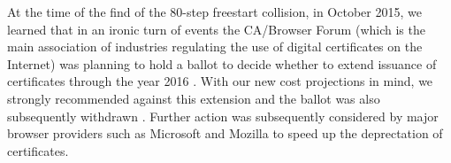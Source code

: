 \medskip

At the time of the find of the 80-step freestart collision, in October 2015, we learned that in an ironic turn of events the CA/Browser Forum (which is the main association of industries regulating the use of digital certificates on the Internet)
was planning to hold a ballot to decide whether to extend issuance of \shaone certificates through the year 2016 \cite{cabforum}.
With our new cost projections in mind, we strongly recommended against this extension and the ballot was also subsequently withdrawn \cite{cabforum2}.
Further action was subsequently considered by major browser providers such as Microsoft \cite{MS_sha} and Mozilla \cite{Moz_sha} to speed up the deprectation of \shaone certificates.
